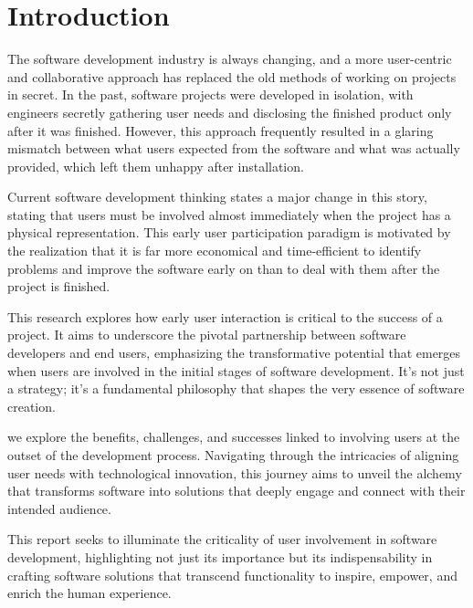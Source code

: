 \documentclass{article}
\begin{document}
\newpage

\section{Introduction}
The software development industry is always changing, and a more user-centric and collaborative approach has replaced the old methods of working on projects in secret. In the past, software projects were developed in isolation, with engineers secretly gathering user needs and disclosing the finished product only after it was finished. However, this approach frequently resulted in a glaring mismatch between what users expected from the software and what was actually provided, which left them unhappy after installation.

Current software development thinking states a major change in this story, stating that users must be involved almost immediately when the project has a physical representation. This early user participation paradigm is motivated by the realization that it is far more economical and time-efficient to identify problems and improve the software early on than to deal with them after the project is finished.

This research explores how early user interaction is critical to the success of a project. It aims to underscore the pivotal partnership between software developers and end users, emphasizing the transformative potential that emerges when users are involved in the initial stages of software development. It's not just a strategy; it's a fundamental philosophy that shapes the very essence of software creation.

 we explore the benefits, challenges, and successes linked to involving users at the outset of the development process. Navigating through the intricacies of aligning user needs with technological innovation, this journey aims to unveil the alchemy that transforms software into solutions that deeply engage and connect with their intended audience.

This report seeks to illuminate the criticality of user involvement in software development, highlighting not just its importance but its indispensability in crafting software solutions that transcend functionality to inspire, empower, and enrich the human experience.

\newpage
\end{document}

